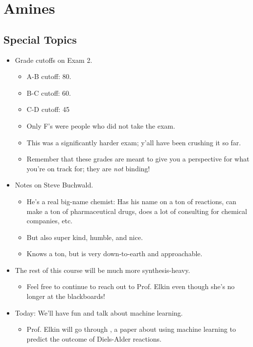 \documentclass[../notes.tex]{subfiles}
\begin{document}
\chapter{Amines}
\setcounter{section}{19}
\section{Special Topics}
\begin{itemize}
    \item {}Grade cutoffs on Exam 2.
    \begin{itemize}
        \item A-B cutoff: 80.
        \item B-C cutoff: 60.
        \item C-D cutoff: 45
        \item Only F's were people who did not take the exam.
        \item This was a significantly harder exam; y'all have been crushing it so far.
        \item Remember that these grades are meant to give you a perspective for what you're on track for; they are \emph{not} binding!
    \end{itemize}
    \item Notes on Steve Buchwald.
    \begin{itemize}
        \item He's a real big-name chemist: Has his name on a ton of reactions, can make a ton of pharmaceutical drugs, does a lot of consulting for chemical companies, etc.
        \item But also super kind, humble, and nice.
        \item Knows a ton, but is very down-to-earth and approachable.
    \end{itemize}
    \item The rest of this course will be much more synthesis-heavy.
    \begin{itemize}
        \item Feel free to continue to reach out to Prof. Elkin even though she's no longer at the blackboards!
    \end{itemize}
    \item Today: We'll have fun and talk about machine learning.
    \begin{itemize}
        \item Prof. Elkin will go through \textcite{bib:ML}, a paper about using machine learning to predict the outcome of Diels-Alder reactions.

\end{itemize}
\end{itemize}
\end{document}
